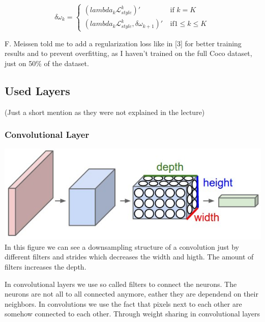 \documentclass[11pt]{article}
\makeatletter
\def\maxwidth{\ifdim\Gin@nat@width>\linewidth\linewidth
    \else\Gin@nat@width\fi}
\let\Oldincludegraphics\includegraphics
\renewcommand{\includegraphics}[1]{\Oldincludegraphics[width=.8\maxwidth]{#1}}
\makeatother
\begin{document}
\[\delta \omega_k=\begin{cases}
(lambda_k \mathcal{L}^k_{style})'  \  & \text{if }k=K\\
(lambda_k \mathcal{L}^k_{style}, \delta \omega_{k+1})'  \  & \text{if} 1 \leq k \leq K\end{cases}\ \]

F. Meissen told me to add a regularization loss like in {[}3{]} for
better training results and to prevent overfitting, as I haven't trained
on the full Coco dataset, just on 50\% of the dataset.

\subsection{Used Layers}\label{used-layers}

(Just a short mention as they were not explained in the lecture)

\subsubsection{Convolutional Layer}\label{convolutional-layer}

\includegraphics{cnn.jpeg} In this figure we can see a downsampling
structure of a convolution just by different filters and strides which
decreases the width and higth. The amount of filters increases the
depth.

In convolutional layers we use so called filters to connect the neurons.
The neurons are not all to all connected anymore, eather they are
dependend on their neighbors. In convolutions we use the fact that
pixels next to each other are somehow connected to each other. Through
weight sharing in convolutional layers
\end{document}
